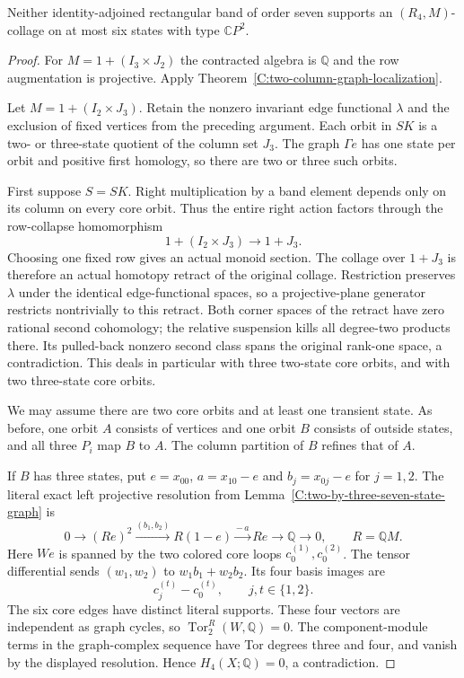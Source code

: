 \begin{lemma}
\label{C:rightzero-three-six-nonsquare}
Neither identity-adjoined rectangular band of order seven
supports an $(R_4,M)$-collage on at most six states with type
$\mathbb CP^2$.
\end{lemma}
\begin{proof}
For $M=1+(I_3\times J_2)$ the contracted algebra is $\mathbb Q$
and the row augmentation is projective.  Apply
Theorem~\ref{C:two-column-graph-localization}.

Let $M=1+(I_2\times J_3)$.  Retain the nonzero invariant edge
functional $\lambda$ and the exclusion of fixed vertices from
the preceding argument.  Each orbit in $SK$ is a two- or
three-state quotient of the column set $J_3$.  The graph
$\Gamma e$ has one state per orbit and positive first homology,
so there are two or three such orbits.

First suppose $S=SK$.  Right multiplication by a band element
depends only on its column on every core orbit.  Thus the entire
right action factors through the row-collapse homomorphism
\[
 1+(I_2\times J_3)\longrightarrow 1+J_3.
\]
Choosing one fixed row gives an actual monoid section.  The
collage over $1+J_3$ is therefore an actual homotopy retract of
the original collage.  Restriction preserves $\lambda$ under
the identical edge-functional spaces, so a projective-plane
generator restricts nontrivially to this retract.  Both corner
spaces of the retract have zero rational second cohomology;
the relative suspension kills all degree-two products there.
Its pulled-back nonzero second class spans the original
rank-one space, a contradiction.  This deals in particular
with three two-state core orbits, and with two three-state
core orbits.

We may assume there are two core orbits and at least one
transient state.  As before, one orbit $A$ consists of vertices
and one orbit $B$ consists of outside states, and all three
$P_i$ map $B$ to $A$.  The column partition of $B$ refines
that of $A$.

If $B$ has three states, put $e=x_{00}$,
$a=x_{10}-e$ and $b_j=x_{0j}-e$ for $j=1,2$.
The literal exact left projective resolution from
Lemma~\ref{C:two-by-three-seven-state-graph} is
\[
 0\longrightarrow(Re)^2\xrightarrow{(b_1,b_2)}
 R(1-e)\xrightarrow{{-}\,a}Re\longrightarrow\mathbb Q
 \longrightarrow0,
 \qquad R=\mathbb QM.
\]
Here $We$ is spanned by the two colored core loops
$c_0^{(1)},c_0^{(2)}$.  The tensor differential sends
$(w_1,w_2)$ to $w_1b_1+w_2b_2$.  Its four basis images are
\[
 c_j^{(t)}-c_0^{(t)},\qquad j,t\in\{1,2\}.
\]
The six core edges have distinct literal supports.  These four
vectors are independent as graph cycles, so
$\operatorname{Tor}_2^R(W,\mathbb Q)=0$.  The component-module
terms in the graph-complex sequence have Tor degrees three and
four, and vanish by the displayed resolution.  Hence
$H_4(X;\mathbb Q)=0$, a contradiction.


\end{proof}
